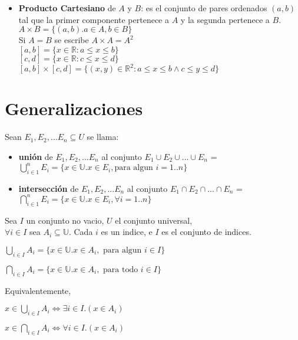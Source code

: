 \documentclass[11pt,a4paper]{article}
\begin{document}
\begin{itemize}
\item \textbf{Producto Cartesiano} de $A$ y $B$: es el conjunto de pares ordenados $(a,b)$ tal que la primer componente pertenece a $A$ y la segunda pertenece a $B$.\\
$A\times B = \{ (a,b) . a\in A, b\in B \}$\\
Si $A = B$ se escribe $A \times A = A^2$\\

$[a,b] = \{x \in \mathbb{R} : a \leq x \leq b\}$\\
$[c,d] = \{x \in \mathbb{R} : c \leq x \leq d\}$\\
$[a,b]\times[c,d] = \{(x,y) \in \mathbb{R}^2 : a \leq x \leq b \land c \leq y \leq d\}$
\end{itemize}
\newpage

\section{Generalizaciones}
\noindent Sean $E_1, E_2,...E_n \subseteq U$ se llama:
\begin{itemize}
\item \textbf{uni\'on} de $E_1, E_2,...E_n$ al conjunto $E_1 \cup E_2 \cup ... \cup E_n$ = $\displaystyle{\bigcup_{i \in 1}^{n} E_i} = \{ x \in \mathbb{U} . x\in E_i, \text{para algun } i=1..n \}$
\item \textbf{intersecci\'on} de $E_1, E_2,...E_n$ al conjunto $E_1 \cap E_2 \cap ... \cap E_n$ = $\displaystyle{\bigcap_{i \in 1}^{n} E_i} = \{ x \in \mathbb{U} . x\in E_i, \forall i=1..n \}$
\end{itemize}

\noindent Sea $I$ un conjunto no vacio, $U$ el conjunto universal,\\
$\forall i \in I$ sea $A_i \subseteq \mathbb{U}$. Cada $i$ es un indice, e $I$ es el conjunto de indices.\\
\begin{itemize}
\begin{multicols}{2}
\item $\displaystyle{\bigcup_{i \in I} A_i} = \{ x \in \mathbb{U} . x\in A_i, \text{ para algun } i\in I \}$
\item $\displaystyle{\bigcap_{i \in I} A_i} = \{ x \in \mathbb{U} . x\in A_i, \text{ para todo } i\in I \}$
\end{multicols}
\end{itemize}
Equivalentemente,
\begin{itemize}
\begin{multicols}{2}
\item $x \in \displaystyle{\bigcup_{i \in I} A_i} \iff \exists i \in I . (x \in A_i)$
\item $x \in \displaystyle{\bigcap_{i \in I} A_i} \iff \forall i \in I . (x \in A_i)$
\end{multicols}
\end{itemize}
\end{document}
